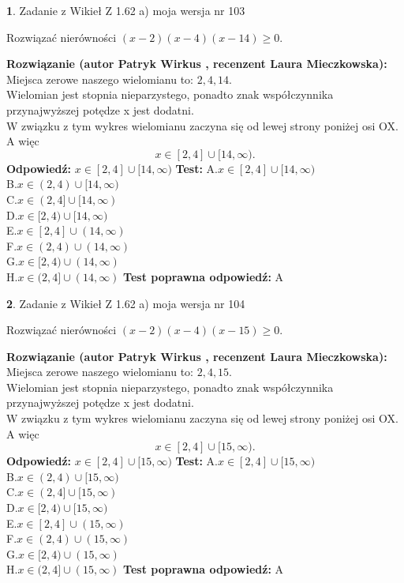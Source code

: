 \documentclass[12pt, a4paper]{article}
\theoremstyle{definition} %
\newtheorem{zad}{}
\newcommand{\zadStart}[1]{\begin{zad}#1\newline}
\newcommand{\zadStop}{\end{zad}}
\newcommand{\rozwStart}[2]{\noindent \textbf{Rozwiązanie (autor #1 , recenzent #2): }\newline}
\newcommand{\rozwStop}{\newline}
\newcommand{\odpStart}{\noindent \textbf{Odpowiedź:}\newline}
\newcommand{\odpStop}{\newline}
\newcommand{\testStart}{\noindent \textbf{Test:}\newline}
\newcommand{\testStop}{\newline}
\newcommand{\kluczStart}{\noindent \textbf{Test poprawna odpowiedź:}\newline}
\newcommand{\kluczStop}{\newline}
\begin{document}
\zadStart{Zadanie z Wikieł Z 1.62 a) moja wersja nr 103}

Rozwiązać nierówności $(x-2)(x-4)(x-14)\ge0$.
\zadStop
\rozwStart{Patryk Wirkus}{Laura Mieczkowska}
Miejsca zerowe naszego wielomianu to: $2, 4, 14$.\\
Wielomian jest stopnia nieparzystego, ponadto znak współczynnika przy\linebreak najwyższej potędze x jest dodatni.\\ W związku z tym wykres wielomianu zaczyna się od lewej strony poniżej osi OX. A więc $$x \in [2,4] \cup [14,\infty).$$
\rozwStop
\odpStart
$x \in [2,4] \cup [14,\infty)$
\odpStop
\testStart
A.$x \in [2,4] \cup [14,\infty)$\\
B.$x \in (2,4) \cup [14,\infty)$\\
C.$x \in (2,4] \cup [14,\infty)$\\
D.$x \in [2,4) \cup [14,\infty)$\\
E.$x \in [2,4] \cup (14,\infty)$\\
F.$x \in (2,4) \cup (14,\infty)$\\
G.$x \in [2,4) \cup (14,\infty)$\\
H.$x \in (2,4] \cup (14,\infty)$
\testStop
\kluczStart
A
\kluczStop



\zadStart{Zadanie z Wikieł Z 1.62 a) moja wersja nr 104}

Rozwiązać nierówności $(x-2)(x-4)(x-15)\ge0$.
\zadStop
\rozwStart{Patryk Wirkus}{Laura Mieczkowska}
Miejsca zerowe naszego wielomianu to: $2, 4, 15$.\\
Wielomian jest stopnia nieparzystego, ponadto znak współczynnika przy\linebreak najwyższej potędze x jest dodatni.\\ W związku z tym wykres wielomianu zaczyna się od lewej strony poniżej osi OX. A więc $$x \in [2,4] \cup [15,\infty).$$
\rozwStop
\odpStart
$x \in [2,4] \cup [15,\infty)$
\odpStop
\testStart
A.$x \in [2,4] \cup [15,\infty)$\\
B.$x \in (2,4) \cup [15,\infty)$\\
C.$x \in (2,4] \cup [15,\infty)$\\
D.$x \in [2,4) \cup [15,\infty)$\\
E.$x \in [2,4] \cup (15,\infty)$\\
F.$x \in (2,4) \cup (15,\infty)$\\
G.$x \in [2,4) \cup (15,\infty)$\\
H.$x \in (2,4] \cup (15,\infty)$
\testStop
\kluczStart
A
\kluczStop
\end{document}
